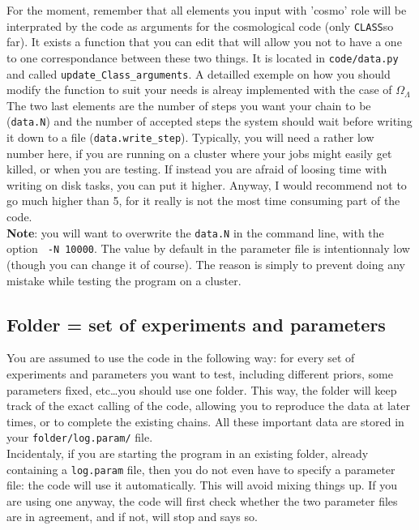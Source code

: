 \documentclass[10pt]{article}
\newcommand{\CLASS}{\texttt{CLASS}}
\begin{document}
  For the moment, remember that all elements you input with 'cosmo' role will
  be interprated by the code as arguments for the cosmological code (only
  \CLASS so far). It exists a function that you can edit that will allow you
  not to have a one to one correspondance between these two things. It is
  located in \verb?code/data.py? and called \verb?update_Class_arguments?. A
  detailled exemple on how you should modify the function to suit your needs is
  alreay implemented with the case of $\Omega_{\Lambda}$\\

  The two last elements are the number of steps you want your chain to be
  (\verb?data.N?) and the number of accepted steps the system should wait
  before writing it down to a file (\verb?data.write_step?). Typically, you
  will need a rather low number here, if you are running on a cluster where
  your jobs might easily get killed, or when you are testing. If instead you
  are afraid of loosing time with writing on disk tasks, you can put it higher.
  Anyway, I would recommend not to go much higher than 5, for it really is not
  the most time consuming part of the code.\\

  {\bf Note}: you will want to overwrite the \verb?data.N? in the command line,
  with the option \verb? -N 10000?. The value by default in the parameter file
  is intentionnaly low (though you can change it of course). The reason is
  simply to prevent doing any mistake while testing the program on a cluster.

  \subsection{Folder = set of experiments and parameters}
  
  You are assumed to use the code in the following way: for every set of
  experiments and parameters you want to test, including different priors, some
  parameters fixed, etc\ldots you should use one folder. This way, the folder
  will keep track of the exact calling of the code, allowing you to reproduce
  the data at later times, or to complete the existing chains. All these
  important data are stored in your \verb?folder/log.param/? file.\\

  Incidentaly, if you are starting the program in an existing folder, already
  containing a \verb?log.param? file, then you do not even have to specify a
  parameter file: the code will use it automatically. This will avoid mixing
  things up. If you are using one anyway, the code will first check whether the
  two parameter files are in agreement, and if not, will stop and says so.\\
\end{document}
